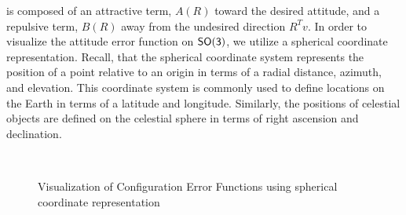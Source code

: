 \documentclass[10pt,fleqn]{IJCAS}  %
\begin{document}
\begin{multicols}{2}
 is composed of an attractive term, \( A (R) \) toward the desired attitude, and a repulsive term, \( B(R) \) away from the undesired direction \( R^T v \).
In order to visualize the attitude error function on \( \mathsf{SO(3)} \), we utilize a spherical coordinate representation.
Recall, that the spherical coordinate system represents the position of a point relative to an origin in terms of a radial distance, azimuth, and elevation.
This coordinate system is commonly used to define locations on the Earth in terms of a latitude and longitude.
Similarly, the positions of celestial objects are defined on the celestial sphere in terms of right ascension and declination. 
\end{multicols}
\begin{figure}[H]%
    \centering 
    ~
    ~
    \caption{Visualization of Configuration Error Functions using spherical coordinate representation}
    \label{fig:config_error} 
\end{figure}%
\end{document}
